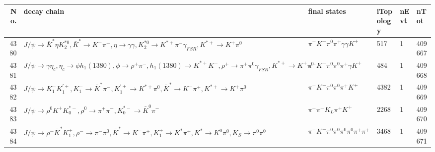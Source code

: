 \begin{table}[htbp] 
\begin{center}
\begin{small}
\begin{tabular}{rlllll}\hline\hline
 No. & decay chain & final states &  iTopology & nEvt & nTot \\\hline
4380&$J/\psi       \rightarrow \bar{K}^{*}   \eta          K_2^{*0}       , \bar{K}^{*}    \rightarrow K^{-}          \pi^{+}        , \eta           \rightarrow \gamma       \gamma       , K_2^{*0}        \rightarrow K^{*+}         \pi^{-}        \gamma_{FSR} , K^{*+}          \rightarrow K^{+}          \pi^{0}        $&$\pi^{-}        K^{-}          \pi^{0}        \pi^{+}        \gamma       \gamma       K^{+}          $&  517&    1&409667\\
4381&$J/\psi       \rightarrow \gamma       \eta_{c}    , \eta_{c}     \rightarrow \phi           h_{1}(1380)    , \phi            \rightarrow \rho^{+}      \pi^{-}        , h_{1}(1380)     \rightarrow K^{*+}         K^{-}          , \rho^{+}       \rightarrow \pi^{+}        \pi^{0}        \gamma_{FSR} , K^{*+}          \rightarrow K^{+}          \pi^{0}        $&$\pi^{-}        K^{-}          \pi^{0}        \pi^{0}        \pi^{+}        \gamma       K^{+}          $&  484&    1&409668\\
4382&$J/\psi       \rightarrow K_{1}^{-}      K_1^{'+}      , K_{1}^{-}       \rightarrow \bar{K}^{*}   \pi^{-}        , K_1^{'+}       \rightarrow K^{*+}         \pi^{0}        , \bar{K}^{*}    \rightarrow K^{-}          \pi^{+}        , K^{*+}          \rightarrow K^{+}          \pi^{0}        $&$\pi^{-}        K^{-}          \pi^{0}        \pi^{0}        \pi^{+}        K^{+}          $& 4382&    1&409669\\
4383&$J/\psi       \rightarrow \rho^{0}      K^{+}          K_{0}^{*-}     , \rho^{0}       \rightarrow \pi^{+}        \pi^{-}        , K_{0}^{*-}      \rightarrow \bar{K}^{0}   \pi^{-}        $&$\pi^{-}        \pi^{-}        K_{L}          \pi^{+}        K^{+}          $& 2268&    1&409670\\
4384&$J/\psi       \rightarrow \rho^{-}      \bar{K}^{*}   K_1^{+}        , \rho^{-}       \rightarrow \pi^{-}        \pi^{0}        , \bar{K}^{*}    \rightarrow K^{-}          \pi^{+}        , K_1^{+}         \rightarrow K^{*}          \pi^{+}        , K^{*}           \rightarrow K^{0}          \pi^{0}        , K_{S}           \rightarrow \pi^{0}        \pi^{0}        $&$\pi^{-}        K^{-}          \pi^{0}        \pi^{0}        \pi^{0}        \pi^{0}        \pi^{+}        \pi^{+}        $& 3468&    1&409671\\

\end{tabular}
\end{small}
\end{center}
\end{table}
